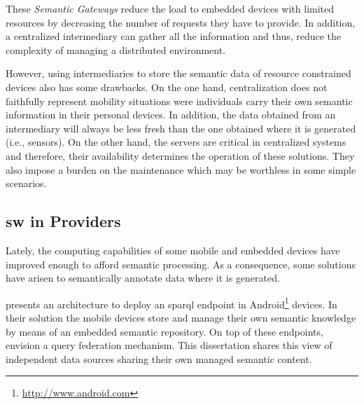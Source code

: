 These \emph{Semantic Gateways} reduce the load to embedded devices with limited resources by decreasing the number of requests they have to provide.
In addition, a centralized intermediary can gather all the information and thus, reduce the complexity of managing a distributed environment.

However, using intermediaries to store the semantic data of resource constrained devices also has some drawbacks.
On the one hand, centralization does not faithfully represent mobility situations were individuals carry their own semantic information in their personal devices.
In addition, the data obtained from an intermediary will always be less fresh than the one obtained where it is generated (i.e., sensors).
On the other hand, the servers are critical in centralized systems and therefore, their availability determines the operation of these solutions.
They also impose a burden on the maintenance which may be worthless in some simple scenarios.



\subsection{\acl{sw} in Providers}
\label{sec:sw_providers}

Lately, the computing capabilities of some mobile and embedded devices have improved enough to afford semantic processing. %
As a consequence, some solutions have arisen to semantically annotate data where it is generated. %


\citet{daquin_enabling_2011} presents an architecture to deploy an \acs{sparql} endpoint in Android\footnote{\url{http://www.android.com}} devices.
In their solution the mobile devices store and manage their own semantic knowledge by means of an embedded semantic repository.
On top of these endpoints, \citeauthor{daquin_enabling_2011} envision a query federation mechanism.
This dissertation shares this view of independent data sources sharing their own managed semantic content. %


